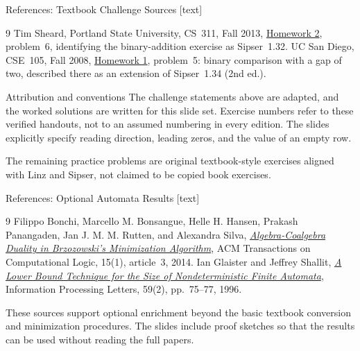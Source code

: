 \documentclass[10pt]{beamer}
\begin{document}
\begin{frame}{References: Textbook Challenge Sources}
  \small
  [text]
  \begin{thebibliography}{9}
      Tim Sheard, Portland State University, CS~311, Fall 2013,
      \href{https://web.cecs.pdx.edu/~sheard/course/CS311/Fall2013/homework/assign2.pdf}
      {Homework 2}, problem~6, identifying the binary-addition exercise
      as Sipser~1.32.
      UC San Diego, CSE~105, Fall 2008,
      \href{https://cseweb.ucsd.edu/classes/fa08/cse105/hw1.pdf}
      {Homework 1}, problem~5: binary comparison with a gap of two,
      described there as an extension of Sipser~1.34 (2nd ed.).
  \end{thebibliography}
  \begin{block}{Attribution and conventions}
    The challenge statements above are adapted, and the worked solutions
    are written for this slide set. Exercise numbers refer to these
    verified handouts, not to an assumed numbering in every edition.
    The slides explicitly specify reading direction, leading zeros,
    and the value of an empty row.
  \end{block}
  The remaining practice problems are original textbook-style exercises
  aligned with Linz and Sipser, not claimed to be copied book exercises.
\end{frame}

\begin{frame}{References: Optional Automata Results}
  \small
  [text]
  \begin{thebibliography}{9}
      Filippo Bonchi, Marcello M. Bonsangue, Helle H. Hansen,
      Prakash Panangaden, Jan J. M. M. Rutten, and Alexandra Silva,
      \href{https://doi.org/10.1145/2490818}
      {\emph{Algebra-Coalgebra Duality in Brzozowski's Minimization Algorithm}},
      ACM Transactions on Computational Logic, 15(1), article~3, 2014.
      Ian Glaister and Jeffrey Shallit,
      \href{https://doi.org/10.1016/0020-0190(96)00095-6}
      {\emph{A Lower Bound Technique for the Size of Nondeterministic
      Finite Automata}}, Information Processing Letters, 59(2),
      pp.\ 75--77, 1996.
  \end{thebibliography}
  These sources support optional enrichment beyond the basic textbook
  conversion and minimization procedures. The slides include proof
  sketches so that the results can be used without reading the full papers.
\end{frame}
\end{document}
